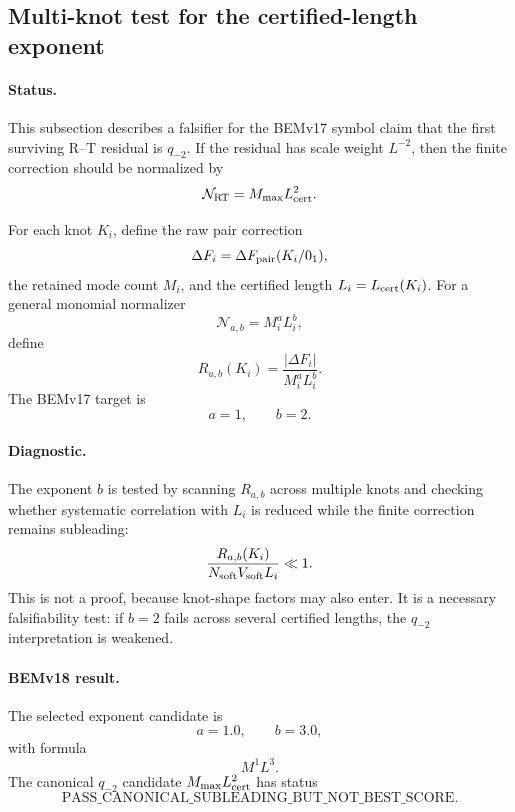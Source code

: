 
\subsection{Multi-knot test for the certified-length exponent}

\paragraph{Status.}
This subsection describes a falsifier for the BEMv17 symbol claim that the
first surviving R--T residual is \(q_{-2}\).  If the residual has scale weight
\(L^{-2}\), then the finite correction should be normalized by
\[
\mathcal N_{\rm RT}=M_{\max}L_{\rm cert}^{2}.
\]

For each knot \(K_i\), define the raw pair correction
\[
\Delta F_i=\Delta F_{\rm pair}(K_i/0_1),
\]
the retained mode count \(M_i\), and the certified length \(L_i=L_{\rm cert}(K_i)\).
For a general monomial normalizer
\[
\mathcal N_{a,b}=M_i^a L_i^b,
\]
define
\[
R_{a,b}(K_i)=
\frac{|\Delta F_i|}
{M_i^aL_i^b}.
\]
The BEMv17 target is
\[
a=1,\qquad b=2.
\]

\paragraph{Diagnostic.}
The exponent \(b\) is tested by scanning \(R_{a,b}\) across multiple knots and
checking whether systematic correlation with \(L_i\) is reduced while the
finite correction remains subleading:
\[
\frac{R_{a,b}(K_i)}
{N_{\rm soft}V_{\rm soft}L_i}
\ll 1.
\]
This is not a proof, because knot-shape factors may also enter.  It is a
necessary falsifiability test: if \(b=2\) fails across several certified
lengths, the \(q_{-2}\) interpretation is weakened.

\paragraph{BEMv18 result.}
The selected exponent candidate is
\[
a=1.0,\qquad b=3.0,
\]
with formula
\[
M^1 L^3.
\]
The canonical \(q_{-2}\) candidate \(M_{\max}L_{\rm cert}^{2}\) has status
\[
\boxed{\text{PASS_CANONICAL_SUBLEADING_BUT_NOT_BEST_SCORE}}.
\]
